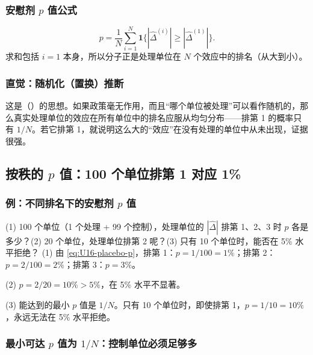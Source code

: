 \subsubsection{安慰剂 \texorpdfstring{$p$}{p} 值公式}

\begin{equation}\label{eq:U16-placebo-p}
p=\frac1N\sum_{i=1}^N\mathbf{1}\Big\{|\hat\Delta^{(i)}|\ge|\hat\Delta^{(1)}|\Big\}.
\end{equation}
求和包括 $i=1$ 本身，所以分子正是处理单位在 $N$ 个效应中的排名（从大到小）。

\subsubsection{直觉：随机化（置换）推断}

这是（）的思想。如果政策毫无作用，而且“哪个单位被处理”可以看作随机的，那么真实处理单位的效应在所有单位中的排名应服从均匀分布——排第 1 的概率只有 $1/N$。若它排第 1，就说明这么大的“效应”在没有处理的单位中从未出现，证据很强。

\subsection{按秩的 \texorpdfstring{$p$}{p} 值：100 个单位排第 1 对应 1\%}

\subsubsection{例：不同排名下的安慰剂 \texorpdfstring{$p$}{p} 值}

\begin{exmp}[安慰剂 $p$ 值]
(1) 100 个单位（1 个处理 + 99 个控制），处理单位的 $|\hat\Delta|$ 排第 1、2、3 时 $p$ 各是多少？(2) 20 个单位，处理单位排第 2 呢？(3) 只有 10 个单位时，能否在 5\% 水平拒绝？
\solution
(1) 由 \eqref{eq:U16-placebo-p}，排第 1：$p=1/100=1\%$；排第 2：$p=2/100=2\%$；排第 3：$p=3\%$。

(2) $p=2/20=10\%>5\%$，在 5\% 水平不显著。

(3) 能达到的最小 $p$ 值是 $1/N$。只有 10 个单位时，即使排第 1，$p=1/10=10\%$，永远无法在 5\% 水平拒绝。
\end{exmp}

\subsubsection{最小可达 \texorpdfstring{$p$}{p} 值为 \texorpdfstring{$1/N$}{1/N}：控制单位必须足够多}


